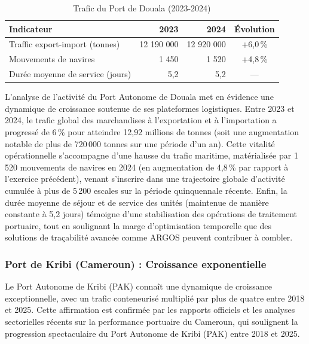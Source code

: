 \begin{table}[ht]
\centering
\caption{Trafic du Port de Douala (2023-2024)} \label{tab:trafic_douala}
\begin{tabularx}{\textwidth}{@{}Xrrc@{}}
\toprule
\rowcolor{BleuNuit}\color{white}\textbf{Indicateur} & \rowcolor{BleuNuit}\color{white}\textbf{2023} & \rowcolor{BleuNuit}\color{white}\textbf{2024} & \rowcolor{BleuNuit}\color{white}\textbf{Évolution} \\
\midrule
Traffic export-import (tonnes) & 12 190 000 & 12 920 000 & +6,0\,\% \\
\rowcolor{BleuClair}Mouvements de navires & 1 450 & 1 520 & +4,8\,\% \\
Durée moyenne de service (jours) & 5,2 & 5,2 & — \\
\bottomrule
\end{tabularx}
\end{table}
\tablesourcepromoteurs

L'analyse de l'activité du Port Autonome de Douala met en évidence une dynamique de croissance soutenue de ses plateformes logistiques\cite{pad2025}. 
Entre 2023 et 2024, le trafic global des marchandises à l'exportation et à l'importation a progressé de 6\,\% 
pour atteindre 12,92 millions de tonnes (soit une augmentation notable de plus de 720\,000 tonnes sur une période d'un an)\cite{pad2025}. 
Cette vitalité opérationnelle s'accompagne d'une hausse du trafic maritime, matérialisée par 1\,520 mouvements de navires en 2024 (en augmentation de 4,8\,\% par rapport à l'exercice précédent), 
venant s'inscrire dans une trajectoire globale d'activité cumulée à plus de 5\,200 escales sur la période quinquennale récente\cite{pad2025}. 
Enfin, la durée moyenne de séjour et de service des unités (maintenue de manière constante à 5,2 jours) témoigne d'une stabilisation des opérations de traitement portuaire\cite{pad2025}, 
tout en soulignant la marge d'optimisation temporelle que des solutions de traçabilité avancée comme ARGOS peuvent 
contribuer à combler.

\subsubsection{Port de Kribi (Cameroun) : Croissance exponentielle}
Le Port Autonome de Kribi (PAK) connaît une dynamique de croissance exceptionnelle, avec un trafic conteneurisé multiplié par plus de quatre entre 2018 et 2025\cite{pak2026}. Cette affirmation est confirmée par les rapports officiels et les analyses sectorielles récents sur la performance portuaire du Cameroun, qui soulignent la progression spectaculaire du Port Autonome de Kribi (PAK) entre 2018 et 2025\cite{pak2026}.

